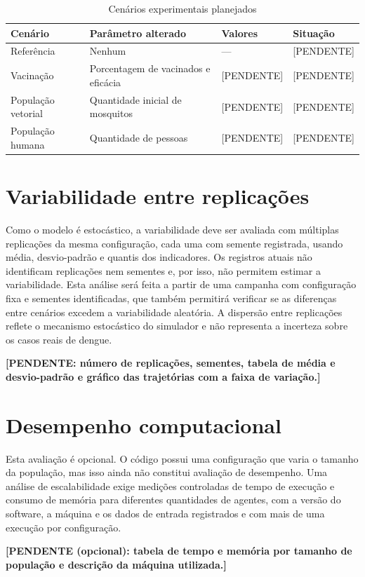 \begin{table}[htb]
    \centering
    \caption{Cenários experimentais planejados}
    \label{tab:cenarios}
    \begin{tabular}{p{3.2cm} p{4.0cm} p{3.2cm} p{3.2cm}}
        \hline
        \textbf{Cenário} & \textbf{Parâmetro alterado} & \textbf{Valores} & \textbf{Situação} \\
        \hline
        Referência & Nenhum & --- & [PENDENTE] \\
        Vacinação & Porcentagem de vacinados e eficácia & [PENDENTE] & [PENDENTE] \\
        População vetorial & Quantidade inicial de mosquitos & [PENDENTE] & [PENDENTE] \\
        População humana & Quantidade de pessoas & [PENDENTE] & [PENDENTE] \\
        \hline
    \end{tabular}
\end{table}

\section{Variabilidade entre replicações}

Como o modelo é estocástico, a variabilidade deve ser avaliada com múltiplas replicações da mesma configuração, cada uma com semente registrada, usando média, desvio-padrão e quantis dos indicadores. Os registros atuais não identificam replicações nem sementes e, por isso, não permitem estimar a variabilidade. Esta análise será feita a partir de uma campanha com configuração fixa e sementes identificadas, que também permitirá verificar se as diferenças entre cenários excedem a variabilidade aleatória. A dispersão entre replicações reflete o mecanismo estocástico do simulador e não representa a incerteza sobre os casos reais de dengue.

\textbf{[PENDENTE: número de replicações, sementes, tabela de média e desvio-padrão e gráfico das trajetórias com a faixa de variação.]}

\section{Desempenho computacional}

Esta avaliação é opcional. O código possui uma configuração que varia o tamanho da população, mas isso ainda não constitui avaliação de desempenho. Uma análise de escalabilidade exige medições controladas de tempo de execução e consumo de memória para diferentes quantidades de agentes, com a versão do software, a máquina e os dados de entrada registrados e com mais de uma execução por configuração.

\textbf{[PENDENTE (opcional): tabela de tempo e memória por tamanho de população e descrição da máquina utilizada.]}